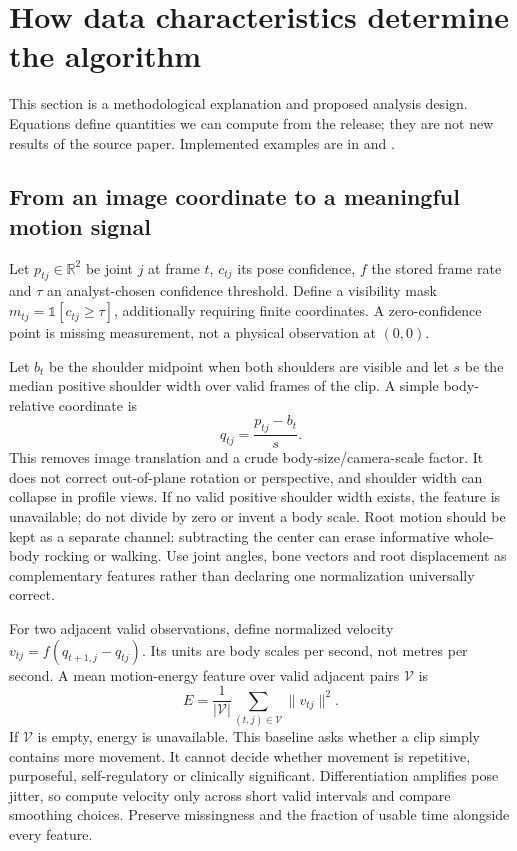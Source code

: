 \section{How data characteristics determine the algorithm}
This section is a methodological explanation and proposed analysis design. Equations define quantities we can compute from the release; they are not new results of the source paper. Implemented examples are in  and .

\subsection{From an image coordinate to a meaningful motion signal}
Let $p_{tj}\in\mathbb R^2$ be joint $j$ at frame $t$, $c_{tj}$ its pose confidence, $f$ the stored frame rate and $\tau$ an analyst-chosen confidence threshold. Define a visibility mask $m_{tj}=\mathbb{1}[c_{tj}\geq\tau]$, additionally requiring finite coordinates. A zero-confidence point is missing measurement, not a physical observation at $(0,0)$.

Let $b_t$ be the shoulder midpoint when both shoulders are visible and let $s$ be the median positive shoulder width over valid frames of the clip. A simple body-relative coordinate is
\[
q_{tj}=\frac{p_{tj}-b_t}{s}.
\]
This removes image translation and a crude body-size/camera-scale factor. It does not correct out-of-plane rotation or perspective, and shoulder width can collapse in profile views. If no valid positive shoulder width exists, the feature is unavailable; do not divide by zero or invent a body scale. Root motion should be kept as a separate channel: subtracting the center can erase informative whole-body rocking or walking. Use joint angles, bone vectors and root displacement as complementary features rather than declaring one normalization universally correct.

For two adjacent valid observations, define normalized velocity $v_{tj}=f(q_{t+1,j}-q_{tj})$. Its units are body scales per second, not metres per second. A mean motion-energy feature over valid adjacent pairs $\mathcal V$ is
\[
E=\frac{1}{|\mathcal V|}\sum_{(t,j)\in\mathcal V}\|v_{tj}\|^2.
\]
If $\mathcal V$ is empty, energy is unavailable. This baseline asks whether a clip simply contains more movement. It cannot decide whether movement is repetitive, purposeful, self-regulatory or clinically significant. Differentiation amplifies pose jitter, so compute velocity only across short valid intervals and compare smoothing choices. Preserve missingness and the fraction of usable time alongside every feature.

